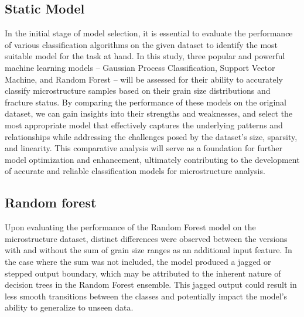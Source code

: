 \documentclass[10pt]{article}
\begin{document}
\begin{multicols}{2}
\section{Static Model}
  
In the initial stage of model selection, it is essential to evaluate the performance of various classification algorithms on the given dataset to identify the most suitable model for the task at hand. In this study, three popular and powerful machine learning models – Gaussian Process Classification, Support Vector Machine, and Random Forest – will be assessed for their ability to accurately classify microstructure samples based on their grain size distributions and fracture status. By comparing the performance of these models on the original dataset, we can gain insights into their strengths and weaknesses, and select the most appropriate model that effectively captures the underlying patterns and relationships while addressing the challenges posed by the dataset's size, sparsity, and linearity. This comparative analysis will serve as a foundation for further model optimization and enhancement, ultimately contributing to the development of accurate and reliable classification models for microstructure analysis.

\subsection{Random forest}

Upon evaluating the performance of the Random Forest model on the microstructure dataset, distinct differences were observed between the versions with and without the sum of grain size ranges as an additional input feature. In the case where the sum was not included, the model produced a jagged or stepped output boundary, which may be attributed to the inherent nature of decision trees in the Random Forest ensemble. This jagged output could result in less smooth transitions between the classes and potentially impact the model's ability to generalize to unseen data.


\end{multicols}
\end{document}
